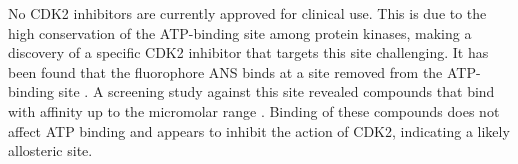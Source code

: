 No CDK2 inhibitors are currently approved for clinical use.
This is due to the high conservation of the ATP-binding site among protein kinases, making a discovery of a specific CDK2 inhibitor that targets this site challenging.
It has been found that the fluorophore ANS binds at a site removed from the ATP-binding site \cite{Betzi2011}.
A screening study against this site revealed compounds that bind with affinity up to the micromolar range \cite{Rastelli2014}.
Binding of these compounds does not affect ATP binding and appears to inhibit the action of CDK2, indicating a likely allosteric site.
